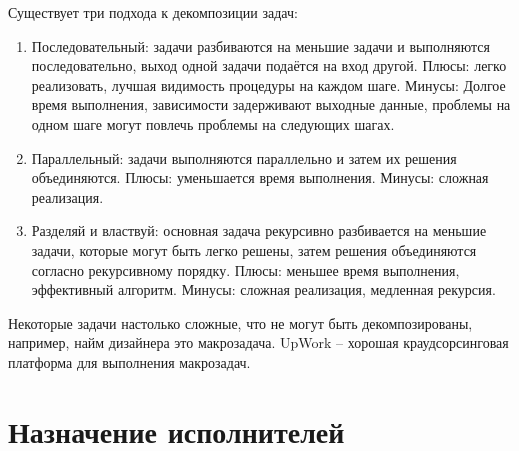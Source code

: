 \documentclass[specification,annotation,times]{itmo-student-thesis}
\begin{document}
Существует три подхода к декомпозиции задач:
\begin{enumerate}
    \item Последовательный: задачи разбиваются на меньшие задачи и выполняются последовательно, выход одной задачи подаётся на вход другой. Плюсы: легко реализовать, лучшая видимость процедуры на каждом шаге. Минусы: Долгое время выполнения, зависимости задерживают выходные данные, проблемы на одном шаге могут повлечь проблемы на следующих шагах.
    \item Параллельный: задачи выполняются параллельно и затем их решения объединяются. Плюсы: уменьшается время выполнения. Минусы: сложная реализация.
    \item Разделяй и властвуй: основная задача рекурсивно разбивается на меньшие задачи, которые могут быть легко решены, затем решения объединяются согласно рекурсивному порядку. Плюсы: меньшее время выполнения, эффективный алгоритм. Минусы: сложная реализация, медленная рекурсия.
\end{enumerate}

Некоторые задачи настолько сложные, что не могут быть декомпозированы, например, найм дизайнера это макрозадача. UpWork – хорошая краудсорсинговая платформа для выполнения макрозадач.

\section{Назначение исполнителей}
\end{document}
